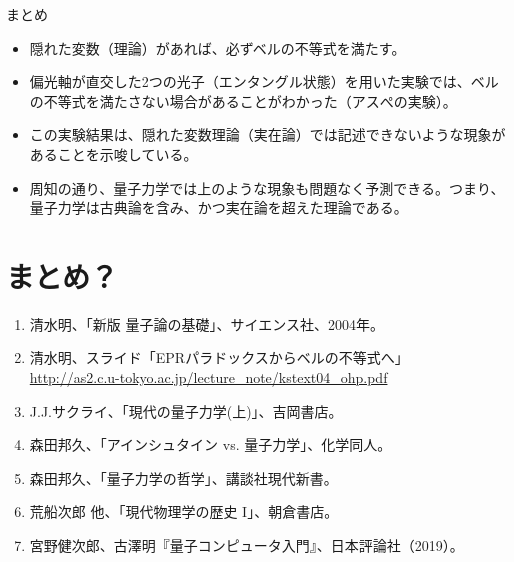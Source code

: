 \documentclass[10pt,b5paper,papersize,dvipdfmx]{jsbook}
\begin{document}
まとめ

\begin{itemize}
  \item 隠れた変数（理論）があれば、必ずベルの不等式を満たす。
  \item 偏光軸が直交した2つの光子（エンタングル状態）を用いた実験では、ベルの不等式を満たさない場合があることがわかった（アスぺの実験）。
  \item この実験結果は、隠れた変数理論（実在論）では記述できないような現象があることを示唆している。
  \item 周知の通り、量子力学では上のような現象も問題なく予測できる。つまり、量子力学は古典論を含み、かつ実在論を超えた理論である。
\end{itemize}

\fi
\section{まとめ？}



\clearpage

\begin{sanko}
  \begin{enumerate}
    \item 清水明、「新版 量子論の基礎」、サイエンス社、2004年。
    \item 清水明、スライド「EPRパラドックスからベルの不等式へ」\\
      \url{http://as2.c.u-tokyo.ac.jp/lecture_note/kstext04_ohp.pdf}
    \item J.J.サクライ、「現代の量子力学(上)」、吉岡書店。
    \item 森田邦久、「アインシュタイン vs. 量子力学」、化学同人。
    \item 森田邦久、「量子力学の哲学」、講談社現代新書。
    \item 荒船次郎 他、「現代物理学の歴史 I」、朝倉書店。
    \item 宮野健次郎、古澤明『量子コンピュータ入門』、日本評論社（2019）。
  \end{enumerate}
\end{sanko}
\end{document}
